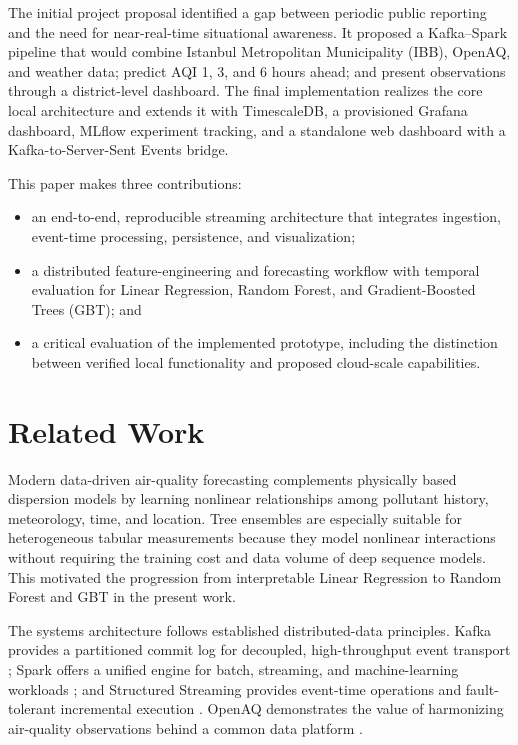 \documentclass[conference]{IEEEtran}
\begin{document}
The initial project proposal identified a gap between periodic public reporting
and the need for near-real-time situational awareness. It proposed a
Kafka--Spark pipeline that would combine Istanbul Metropolitan Municipality
(IBB), OpenAQ, and weather data; predict AQI 1, 3, and 6 hours ahead; and
present observations through a district-level dashboard. The final
implementation realizes the core local architecture and extends it with
TimescaleDB, a provisioned Grafana dashboard, MLflow experiment tracking, and a
standalone web dashboard with a Kafka-to-Server-Sent Events bridge.

This paper makes three contributions:
\begin{itemize}
    \item an end-to-end, reproducible streaming architecture that integrates
    ingestion, event-time processing, persistence, and visualization;
    \item a distributed feature-engineering and forecasting workflow with
    temporal evaluation for Linear Regression, Random Forest, and
    Gradient-Boosted Trees (GBT); and
    \item a critical evaluation of the implemented prototype, including the
    distinction between verified local functionality and proposed cloud-scale
    capabilities.
\end{itemize}

\section{Related Work}
Modern data-driven air-quality forecasting complements physically based
dispersion models by learning nonlinear relationships among pollutant history,
meteorology, time, and location. Tree ensembles are especially suitable for
heterogeneous tabular measurements because they model nonlinear interactions
without requiring the training cost and data volume of deep sequence models.
This motivated the progression from interpretable Linear Regression to Random
Forest and GBT in the present work.

The systems architecture follows established distributed-data principles.
Kafka provides a partitioned commit log for decoupled, high-throughput event
transport \cite{kafka}; Spark offers a unified engine for batch, streaming, and
machine-learning workloads \cite{spark}; and Structured Streaming provides
event-time operations and fault-tolerant incremental execution
\cite{structured_streaming}. OpenAQ demonstrates the value of harmonizing
air-quality observations behind a common data platform \cite{openaq}.
\end{document}

